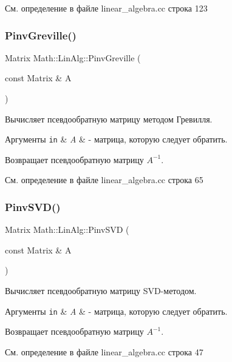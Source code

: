 См. определение в файле linear\+\_\+algebra.\+cc строка 123

\hypertarget{namespace_math_1_1_lin_alg_a03abc1453c96f7898d89262f5278aefc}{}\label{namespace_math_1_1_lin_alg_a03abc1453c96f7898d89262f5278aefc} 
\subsubsection{\texorpdfstring{Pinv\+Greville()}{PinvGreville()}}
{\footnotesize\ttfamily Matrix Math\+::\+Lin\+Alg\+::\+Pinv\+Greville (\begin{DoxyParamCaption}\item[{const Matrix \&}]{A }\end{DoxyParamCaption})}



Вычисляет псевдообратную матрицу методом Гревилля. 


\begin{DoxyParams}[1]{Аргументы}
\mbox{\tt in}  & {\em A} & -\/ матрица, которую следует обратить. \\
\hline
\end{DoxyParams}
\begin{DoxyReturn}{Возвращает}
псевдообратную матрицу $A^{-1}$. 
\end{DoxyReturn}


См. определение в файле linear\+\_\+algebra.\+cc строка 65

\hypertarget{namespace_math_1_1_lin_alg_adaef1c5da9ab98ab6e106086383e3ed6}{}\label{namespace_math_1_1_lin_alg_adaef1c5da9ab98ab6e106086383e3ed6} 
\subsubsection{\texorpdfstring{Pinv\+S\+V\+D()}{PinvSVD()}}
{\footnotesize\ttfamily Matrix Math\+::\+Lin\+Alg\+::\+Pinv\+S\+VD (\begin{DoxyParamCaption}\item[{const Matrix \&}]{A }\end{DoxyParamCaption})}



Вычисляет псевдообратную матрицу S\+V\+D-\/методом. 


\begin{DoxyParams}[1]{Аргументы}
\mbox{\tt in}  & {\em A} & -\/ матрица, которую следует обратить. \\
\hline
\end{DoxyParams}
\begin{DoxyReturn}{Возвращает}
псевдообратную матрицу $A^{-1}$. 
\end{DoxyReturn}


См. определение в файле linear\+\_\+algebra.\+cc строка 47

